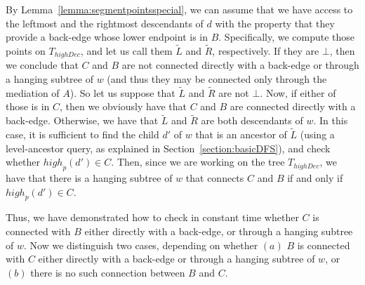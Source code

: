 \documentclass[11pt,a4paper]{article}
\begin{document}
By Lemma~\ref{lemma:segmentpointsspecial}, we can assume that we have access to the leftmost and the rightmost descendants of $d$ with the property that they provide a back-edge whose lower endpoint is in $B$. Specifically, we compute those points on $T_\mathit{highDec}$, and let us call them $\widetilde{L}$ and $\widetilde{R}$, respectively. If they are $\bot$, then we conclude that $C$ and $B$ are not connected directly with a back-edge or through a hanging subtree of $w$ (and thus they may be connected only through the mediation of $A$). So let us suppose that $\widetilde{L}$ and $\widetilde{R}$ are not $\bot$. Now, if either of those is in $C$, then we obviously have that $C$ and $B$ are connected directly with a back-edge. Otherwise, we have that $\widetilde{L}$ and $\widetilde{R}$ are both descendants of $w$. In this case, it is sufficient to find the child $d'$ of $w$ that is an ancestor of $\widetilde{L}$ (using a level-ancestor query, as explained in Section~\ref{section:basicDFS}), and check whether $\mathit{high}_p(d')\in C$. Then, since we are working on the tree $T_\mathit{highDec}$, we have that there is a hanging subtree of $w$ that connects $C$ and $B$ if and only if $\mathit{high}_p(d')\in C$.

Thus, we have demonstrated how to check in constant time whether $C$ is connected with $B$ either directly with a back-edge, or through a hanging subtree of $w$.
Now we distinguish two cases, depending on whether $(a)$ $B$ is connected with $C$ either directly with a back-edge or through a hanging subtree of $w$, or $(b)$ there is no such connection between $B$ and $C$.
\end{document}

